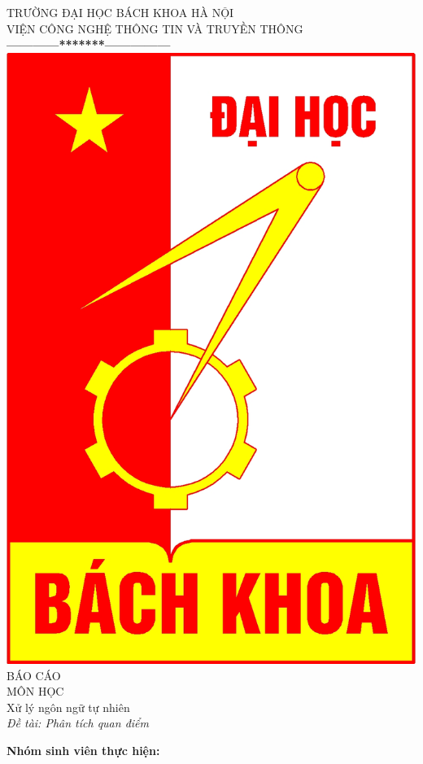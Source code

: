 \documentclass[a4paper,12pt]{report}
\begin{document}
\thispagestyle{empty}
\thisfancypage{
\setlength{\fboxrule}{1pt}
\doublebox}{}
\begin{center}
{\fontsize{16}{19}\selectfont TRƯỜNG ĐẠI HỌC BÁCH KHOA HÀ NỘI\\
VIỆN CÔNG NGHỆ THÔNG TIN VÀ TRUYỀN THÔNG}\\
\textbf{------------*******---------------}\\[1cm]
\includegraphics[scale=0.13]{hust.jpg}\\[1.3cm]

{\fontsize{32}{43}\selectfont BÁO CÁO}\\[0.1cm]
{\fontsize{38}{45}\selectfont MÔN HỌC}\\[0.2cm]
{\fontsize{19}{20}\selectfont Xử lý ngôn ngữ tự nhiên}\\[0.2cm]
{\fontsize{13}{20}\selectfont \emph{Đề tài: Phân tích quan điểm}}\\[2.5cm]
\end{center}
\hspace{1.5cm}\fontsize{14}{16}\selectfont \textbf{Nhóm sinh viên thực hiện:}
\end{document}
